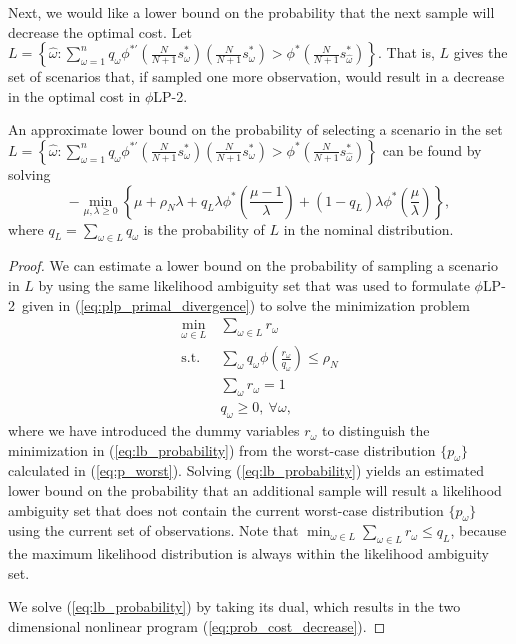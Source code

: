 \documentclass[ijoc,nonblindrev]{informs3} %
\newcommand{\plp}{$\phi$LP-2}
\begin{document}
Next, we would like a lower bound on the probability that the next sample will decrease the optimal cost.
Let $L = \left\{ \hat{\omega} : \sum_{\omega=1}^n q_\omega \phi^{*\prime}\left(\frac{N}{N+1}s^*_\omega\right) \left(\frac{N}{N+1}s^*_\omega\right) > \phi^*\left(\frac{N}{N+1}s^*_{\hat{\omega}}\right) \right\}$.
That is, $L$ gives the set of scenarios that, if sampled one more observation, would result in a decrease in the optimal cost in \plp.

\begin{proposition}
	An approximate lower bound on the probability of selecting a scenario in the set $L = \left\{ \hat{\omega} : \sum_{\omega=1}^n q_\omega \phi^{*\prime}\left(\frac{N}{N+1}s^*_\omega\right) \left(\frac{N}{N+1}s^*_\omega\right) > \phi^*\left(\frac{N}{N+1}s^*_{\hat{\omega}}\right) \right\}$ can be found by solving 
	\begin{equation} \label{eq:prob_cost_decrease}
		-\min_{\mu,\lambda \geq 0} \left\{ \mu + \rho_N \lambda + q_L \lambda \phi^*\left(\frac{\mu-1}{\lambda}\right) + (1-q_L) \lambda \phi^*\left(\frac{\mu}{\lambda}\right) \right\},
	\end{equation}
	where $q_L = \sum_{\omega \in L} q_\omega$ is the probability of $L$ in the nominal distribution.
\end{proposition}

\begin{proof}
	We can estimate a lower bound on the probability of sampling a scenario in $L$ by using the same likelihood ambiguity set that was used to formulate \plp\ given in (\ref{eq:plp_primal_divergence}) to solve the minimization problem
	\begin{align}
		\min_{\omega \in L} \ & \sum_{\omega \in L} r_\omega \nonumber \\
		\mbox{s.t.} & \sum_\omega q_\omega \phi\left(\frac{r_\omega}{q_\omega}\right) \leq \rho_N \label{eq:lb_probability} \\
		& \sum_\omega r_\omega = 1 \nonumber \\
		& q_\omega \geq 0, \ \forall \omega, \nonumber
	\end{align}
	where we have introduced the dummy variables $r_\omega$ to distinguish the minimization in (\ref{eq:lb_probability}) from the worst-case distribution $\{p_\omega\}$ calculated in (\ref{eq:p_worst}). 
	Solving (\ref{eq:lb_probability}) yields an estimated lower bound on the probability that an additional sample will result a likelihood ambiguity set that does not contain the current worst-case distribution $\{p_\omega\}$ using the current set of observations.
	Note that $\min_{\omega \in L} \sum_{\omega \in L} r_\omega \leq q_L$, because the maximum likelihood distribution is always within the likelihood ambiguity set.

	We solve (\ref{eq:lb_probability}) by taking its dual, which results in the two dimensional nonlinear program (\ref{eq:prob_cost_decrease}).
\end{proof}
\end{document}

